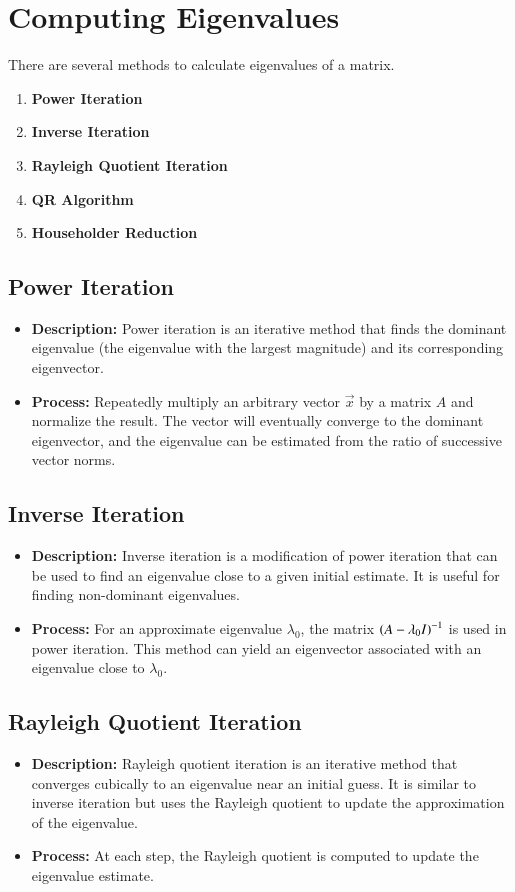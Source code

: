\documentclass[journal]{IEEEtran}
\begin{document}
\section*{\textbf{Computing Eigenvalues}}
There are several methods to calculate eigenvalues of a matrix.
\begin{enumerate}
\item \textbf{Power Iteration}
\item \textbf{Inverse Iteration}
\item \textbf{Rayleigh Quotient Iteration}
\item \textbf{QR Algorithm}
\item \textbf{Householder Reduction}
\end{enumerate}

\subsection*{\textbf{Power Iteration}}
\begin{itemize}
    \item \textbf{Description:} Power iteration is an iterative method that finds the dominant eigenvalue (the eigenvalue with the largest magnitude) and its corresponding eigenvector.
    \item \textbf{Process:} Repeatedly multiply an arbitrary vector $\vec{x}$ by a matrix $A$ and normalize the result. The vector will eventually converge to the dominant eigenvector, and the eigenvalue can be estimated from the ratio of successive vector norms.
\end{itemize}

\subsection*{\textbf{Inverse Iteration}}
\begin{itemize}
    \item \textbf{Description:} Inverse iteration is a modification of power iteration that can be used to find an eigenvalue close to a given initial estimate. It is useful for finding non-dominant eigenvalues.
    \item \textbf{Process:} For an approximate eigenvalue $\lambda_0$, the matrix $\left(A - \lambda_0 I\right)^{-1}$ is used in power iteration. This method can yield an eigenvector associated with an eigenvalue close to $\lambda_0$.
\end{itemize}

\subsection*{\textbf{Rayleigh Quotient Iteration}}
\begin{itemize}
    \item \textbf{Description:} Rayleigh quotient iteration is an iterative method that converges cubically to an eigenvalue near an initial guess. It is similar to inverse iteration but uses the Rayleigh quotient to update the approximation of the eigenvalue.
    \item \textbf{Process:} At each step, the Rayleigh quotient is computed to update the eigenvalue estimate.
\end{itemize}
\end{document}
